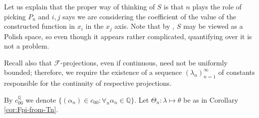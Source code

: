 \documentclass[12pt,fleqn]{amsart}
\newcommand{\IQ}{\mathbb{Q}}
\newcommand{\FF}{\mathscr{F}}
\theoremstyle{definition}
\theoremstyle{remark}
\begin{document}
    Let us explain that the proper way of thinking of $S$ is that $n$ plays the role of picking $P_{n}$ and $i,j$ says we are considering the coefficient of the value of the constructed function in $x_i$ in the $x_j$ axis. Note that by \cite[Theorem 3.1]{Kechris}, $S$ may be viewed as a Polish space, so even though it appears rather complicated, quantifying over it is not a problem. 

Recall also that $\FF$-projections, even if continuous, need not be uniformly bounded; therefore, we require the existence of a sequence $(\lambda_n)_{n=1}^\infty$ of constants responsible for the continuity of respective projections.

By $c_{00}^\IQ$ we denote $\{(\alpha_n)\in c_{00}: \forall_n \alpha_n \in \IQ\}$. Let $\Theta_n\colon \lambda \mapsto \theta $ be as in Corollary \ref{cor:Fpi-from-Tn}.
%
\end{document}
